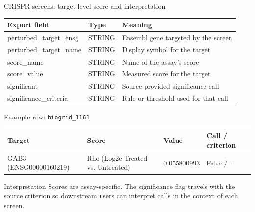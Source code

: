 \documentclass[handout,aspectratio=169]{beamer}
\begin{document}
\begin{frame}{CRISPR screens: target-level score and interpretation}
  \small
  \begin{tabularx}{\textwidth}{@{}>{\ttfamily}l l X@{}}
    \toprule
    \textbf{Export field} & \textbf{Type} & \textbf{Meaning} \\
    \midrule
    perturbed\_target\_ensg & STRING & Ensembl gene targeted by the screen \\
    perturbed\_target\_name & STRING & Display symbol for the target \\
    score\_name & STRING & Name of the assay's score \\
    score\_value & STRING & Measured score for the target \\
    significant & STRING & Source-provided significance call \\
    significance\_criteria & STRING & Rule or threshold used for that call \\
    \bottomrule
  \end{tabularx}
  \vfill
  \begin{block}{Example row: \texttt{biogrid\_1161}}
    \scriptsize
    \begin{tabularx}{\textwidth}{@{}p{3.4cm} p{4.5cm} p{1.8cm} X@{}}
      \textbf{Target} & \textbf{Score} & \textbf{Value} & \textbf{Call / criterion} \\
      \midrule
      GAB3 (ENSG00000160219) & Rho (Log2e Treated vs. Untreated) & 0.055800993 & False / \texttt{-} \\
    \end{tabularx}
  \end{block}
  \vfill
  \begin{block}{Interpretation}
    Scores are assay-specific. The significance flag travels with the source criterion so downstream users can interpret calls in the context of each screen.
  \end{block}
\end{frame}
\end{document}
